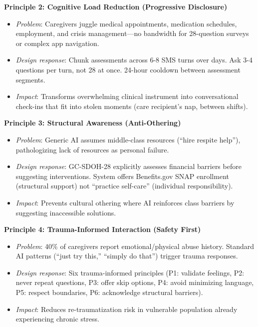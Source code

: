 \documentclass{article}
\begin{document}
\textbf{Principle 2: Cognitive Load Reduction (Progressive Disclosure)}
\begin{itemize}
    \item \textit{Problem}: Caregivers juggle medical appointments, medication schedules, employment, and crisis management—no bandwidth for 28-question surveys or complex app navigation.
    \item \textit{Design response}: Chunk assessments across 6-8 SMS turns over days. Ask 3-4 questions per turn, not 28 at once. 24-hour cooldown between assessment segments.
    \item \textit{Impact}: Transforms overwhelming clinical instrument into conversational check-ins that fit into stolen moments (care recipient's nap, between shifts).
\end{itemize}

\textbf{Principle 3: Structural Awareness (Anti-Othering)}
\begin{itemize}
    \item \textit{Problem}: Generic AI assumes middle-class resources (``hire respite help''), pathologizing lack of resources as personal failure.
    \item \textit{Design response}: GC-SDOH-28 explicitly assesses financial barriers before suggesting interventions. System offers Benefits.gov SNAP enrollment (structural support) not ``practice self-care'' (individual responsibility).
    \item \textit{Impact}: Prevents cultural othering where AI reinforces class barriers by suggesting inaccessible solutions.
\end{itemize}

\textbf{Principle 4: Trauma-Informed Interaction (Safety First)}
\begin{itemize}
    \item \textit{Problem}: 40\% of caregivers report emotional/physical abuse history. Standard AI patterns (``just try this,'' ``simply do that'') trigger trauma responses.
    \item \textit{Design response}: Six trauma-informed principles (P1: validate feelings, P2: never repeat questions, P3: offer skip options, P4: avoid minimizing language, P5: respect boundaries, P6: acknowledge structural barriers).
    \item \textit{Impact}: Reduces re-traumatization risk in vulnerable population already experiencing chronic stress.
\end{itemize}
\end{document}
